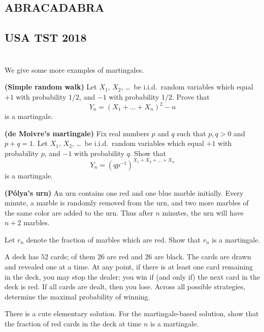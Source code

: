 \subsection{ABRACADABRA}


\subsection{USA TST 2018}

\section{\problemhead}

\begin{problem}
	\label{exer:martingale}
	We give some more examples of martingales.
	\begin{enumerate}[(a)]
		\ii \textbf{(Simple random walk)}
		Let $X_1$, $X_2$, \dots\ be i.i.d.\ random variables
		which equal $+1$ with probability $1/2$,
		and $-1$ with probability $1/2$.
		Prove that
		\[ Y_n = \left( X_1 + \dots + X_n \right)^2 - n \]
		is a martingale.

		\ii \textbf{(de Moivre's martingale)}
		Fix real numbers $p$ and $q$ such that $p,q > 0$ and $p+q=1$.
		Let $X_1$, $X_2$, \dots\ be i.i.d.\ random variables
		which equal $+1$ with probability $p$,
		and $-1$ with probability $q$.
		Show that
		\[ Y_n = \left(qp^{-1}\right)^{X_1 + X_2 + \dots + X_n} \]
		is a martingale.

		\ii \textbf{(P\'{o}lya's urn)}
		An urn contains one red and one blue marble initially.
		Every minute, a marble is randomly removed from the urn,
		and two more marbles of the same color are added to the urn.
		Thus after $n$ minutes, the urn will have $n+2$ marbles.

		Let $r_n$ denote the fraction of marbles which are red.
		Show that $r_n$ is a martingale.
	\end{enumerate}
\end{problem}

\begin{problem}
	A deck has $52$ cards; of them $26$ are red and $26$ are black.
	The cards are drawn and revealed one at a time.
	At any point, if there is at least one card remaining in the deck,
	you may stop the dealer;
	you win if (and only if) the next card in the deck is red.
	If all cards are dealt, then you lose.
	Across all possible strategies,
	determine the maximal probability of winning.
	\begin{hint}
		There is a cute elementary solution.
		For the martingale-based solution,
		show that the fraction of red cards in the deck at time $n$ is a martingale.
	\end{hint}
\end{problem}

